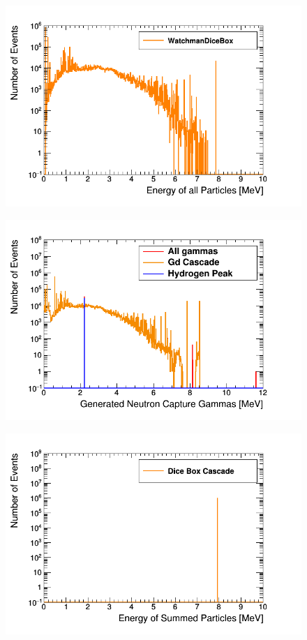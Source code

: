 \begin{figure}[H]
 \centering
 \includegraphics[width=0.7\linewidth]{Chapter4/Figs/Raster/gadolinium/energyOfCascadeOfCascadeGd.png}
 \label{fig:energyOfCascadeOfCascadeGd}
\end{figure}

\begin{figure}[H]
 \centering
 \includegraphics[width=0.7\linewidth]{Chapter4/Figs/Raster/gadolinium/gdCascadeVsAllGammas.png}
 \label{fig:gdCascadeVsAllGammas}
\end{figure}

\begin{figure}[H]
 \centering
 \includegraphics[width=0.7\linewidth]{Chapter4/Figs/Raster/gadolinium/conservationOfCascadeGd.png}
 \label{fig:conservationOfCascadeGd}
\end{figure}

